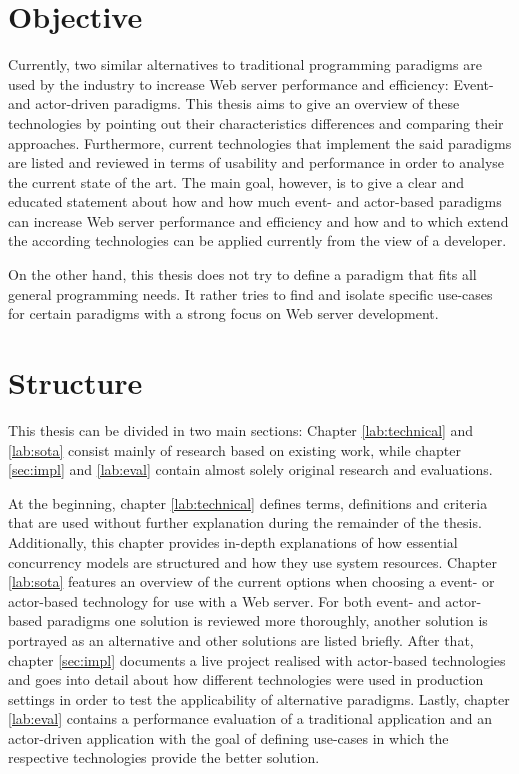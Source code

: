 \section{Objective}
Currently, two similar alternatives to traditional programming paradigms are used by the industry to increase Web server performance and efficiency: Event- and actor-driven paradigms. This thesis aims to give an overview of these technologies by pointing out their characteristics differences and comparing their approaches. Furthermore, current technologies that implement the said paradigms are listed and reviewed in terms of usability and performance in order to analyse the current state of the art. The main goal, however, is to give a clear and educated statement about how and how much event- and actor-based paradigms can increase Web server performance and efficiency and how and to which extend the according technologies can be applied currently from the view of a developer. 

On the other hand, this thesis does not try to define a paradigm that fits all general programming needs. It rather tries to find and isolate specific use-cases for certain paradigms with a strong focus on Web server development.

\section{Structure}
This thesis can be divided in two main sections: Chapter \ref{lab:technical} and \ref{lab:sota} consist mainly of research based on existing work, while chapter \ref{sec:impl} and \ref{lab:eval} contain almost solely original research and evaluations.

At the beginning, chapter \ref{lab:technical} defines terms, definitions and criteria that are used without further explanation during the remainder of the thesis. Additionally, this chapter provides in-depth explanations of how essential concurrency models are structured and how they use system resources. Chapter \ref{lab:sota} features an overview of the current options when choosing a event- or actor-based technology for use with a Web server. For both event- and actor-based paradigms one solution is reviewed more thoroughly, another solution is portrayed as an alternative and other solutions are listed briefly. After that, chapter \ref{sec:impl} documents a live project realised with actor-based technologies and goes into detail about how different technologies were used in production settings in order to test the applicability of alternative paradigms. Lastly, chapter \ref{lab:eval} contains a performance evaluation of a traditional application and an actor-driven application with the goal of defining use-cases in which the respective technologies provide the better solution.